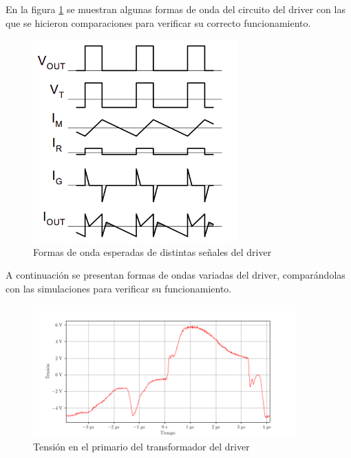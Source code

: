 En la figura \ref{fig:driver_expected_waveforms} se muestran algunas formas de onda del circuito del driver con las que se hicieron comparaciones para verificar su correcto funcionamiento.

\begin{figure}[H]
    \centering
    \includegraphics[width=0.7\textwidth]{images/driver_expected_waveforms.png}
    \caption{Formas de onda esperadas de distintas señales del driver \cite{gatedrivers}}
    \label{fig:driver_expected_waveforms}
\end{figure}

A continuación se presentan formas de ondas variadas del driver, comparándolas con las simulaciones para verificar su funcionamiento.


\begin{figure}[H]
    \centering
    \includegraphics[width=0.9\textwidth]{images/capturas-osciloscopio/17-11-2022/7.png}
    \caption{Tensión en el primario del transformador del driver}
    \label{fig:osc:7}
\end{figure}


